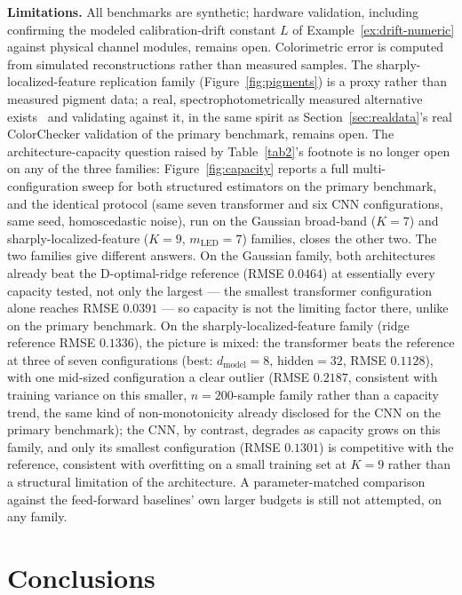 \documentclass[11pt]{article}
\begin{document}
\textbf{Limitations.} All benchmarks are synthetic; hardware validation, including confirming the modeled calibration-drift constant $L$ of Example~\ref{ex:drift-numeric} against physical channel modules, remains open. Colorimetric error is computed from simulated reconstructions rather than measured samples. The sharply-localized-feature replication family (Figure~\ref{fig:pigments}) is a proxy rather than measured pigment data; a real, spectrophotometrically measured alternative exists~\citep{ref38} and validating against it, in the same spirit as Section~\ref{sec:realdata}'s real ColorChecker validation of the primary benchmark, remains open. The architecture-capacity question raised by Table~\ref{tab2}'s footnote is no longer open on any of the three families: Figure~\ref{fig:capacity} reports a full multi-configuration sweep for both structured estimators on the primary benchmark, and the identical protocol (same seven transformer and six CNN configurations, same seed, homoscedastic noise), run on the Gaussian broad-band ($K=7$) and sharply-localized-feature ($K=9$, $m_{\mathrm{LED}}=7$) families, closes the other two. The two families give different answers. On the Gaussian family, both architectures already beat the D-optimal-ridge reference (RMSE $0.0464$) at essentially every capacity tested, not only the largest --- the smallest transformer configuration alone reaches RMSE $0.0391$ --- so capacity is not the limiting factor there, unlike on the primary benchmark. On the sharply-localized-feature family (ridge reference RMSE $0.1336$), the picture is mixed: the transformer beats the reference at three of seven configurations (best: $d_{\mathrm{model}}=8$, hidden$=32$, RMSE $0.1128$), with one mid-sized configuration a clear outlier (RMSE $0.2187$, consistent with training variance on this smaller, $n=200$-sample family rather than a capacity trend, the same kind of non-monotonicity already disclosed for the CNN on the primary benchmark); the CNN, by contrast, degrades as capacity grows on this family, and only its smallest configuration (RMSE $0.1301$) is competitive with the reference, consistent with overfitting on a small training set at $K=9$ rather than a structural limitation of the architecture. A parameter-matched comparison against the feed-forward baselines' own larger budgets is still not attempted, on any family.

\section{Conclusions}
\end{document}
